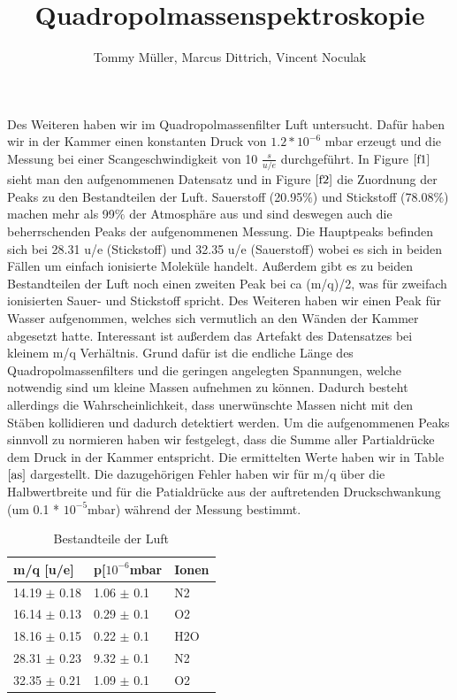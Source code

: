 \documentclass[10pt,a4paper]{article}
\author{Tommy Müller, Marcus Dittrich, Vincent Noculak}
\title{Quadropolmassenspektroskopie}
\begin{document}
Des Weiteren haben wir im Quadropolmassenfilter Luft untersucht. Dafür haben wir in der Kammer einen konstanten Druck von $1.2 * 10^{-6}$ mbar erzeugt und die Messung bei einer Scangeschwindigkeit von 10 $\frac{s}{u/e}$ durchgeführt. In Figure $\ref{f1}$ sieht man den aufgenommenen Datensatz und in Figure $\ref{f2}$ die Zuordnung der Peaks zu den Bestandteilen der Luft. Sauerstoff (20.95$\%$) und Stickstoff (78.08$\%$)  machen mehr als 99$\%$ der Atmosphäre aus und sind deswegen auch die beherrschenden Peaks der aufgenommenen Messung. Die Hauptpeaks befinden sich bei 28.31 u/e (Stickstoff) und 32.35 u/e (Sauerstoff) wobei es sich in beiden Fällen um einfach ionisierte Moleküle handelt. Außerdem gibt es zu beiden Bestandteilen der Luft noch einen zweiten Peak bei ca (m/q)/2, was für zweifach ionisierten Sauer- und Stickstoff spricht. Des Weiteren haben wir einen Peak für Wasser aufgenommen, welches sich vermutlich an den Wänden der Kammer abgesetzt hatte. Interessant ist außerdem das Artefakt des Datensatzes bei kleinem m/q Verhältnis. Grund dafür ist die endliche Länge des Quadropolmassenfilters und die geringen angelegten Spannungen, welche notwendig sind um kleine Massen aufnehmen zu können. Dadurch besteht allerdings die Wahrscheinlichkeit, dass unerwünschte Massen nicht mit den Stäben kollidieren und dadurch detektiert werden. Um die aufgenommenen Peaks sinnvoll zu normieren haben wir festgelegt, dass die Summe aller Partialdrücke dem Druck in der Kammer entspricht. Die ermittelten Werte haben wir in Table $\ref{as}$ dargestellt. Die dazugehörigen Fehler haben wir für m/q über die Halbwertbreite und für die Patialdrücke aus der auftretenden Druckschwankung (um 0.1 * $10^{-5}$mbar) während der Messung bestimmt. 

\begin{table}[k]
	\centering
	\caption{Bestandteile der Luft}
	\label{as}
	\begin{tabular}{|l|l|l|}
		\hline
		m/q {[}u/e{]} & p{[}$10^{-6}$mbar & Ionen \\ \hline
		14.19 $\pm$ 0.18       & 1.06  $\pm$ 0.1    & N2    \\ \hline
		16.14 $\pm$ 0.13       & 0.29  $\pm$ 0.1    & O2    \\ \hline
		18.16 $\pm$ 0.15       & 0.22  $\pm$ 0.1    & H2O   \\ \hline
		28.31 $\pm$ 0.23       & 9.32  $\pm$ 0.1    & N2    \\ \hline
		32.35 $\pm$ 0.21       & 1.09  $\pm$ 0.1    & O2    \\ \hline
	\end{tabular}
\end{table}
\end{document}
